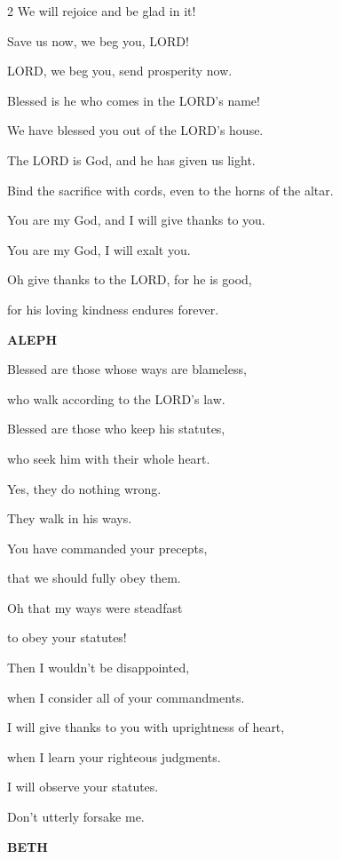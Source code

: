 \begin{multicols}{2}
	We will rejoice and be glad in it!
	
	
	\myverse{}Save us now, we beg you, LORD!
	
	LORD, we beg you, send prosperity now.
	
	
	\myverse{}Blessed is he who comes in the LORD’s name!
	
	We have blessed you out of the LORD’s house.
	
	
	\myverse{}The LORD is God, and he has given us light.
	
	Bind the sacrifice with cords, even to the horns of the altar.
	
	
	\myverse{}You are my God, and I will give thanks to you.
	
	You are my God, I will exalt you.
	
	
	\myverse{}Oh give thanks to the LORD, for he is good,
	
	for his loving kindness endures forever.
	
	
	\mychapter{}\textbf{ALEPH}
	
	\quad\quad\quad \myverse*{}Blessed are those whose ways are blameless,
	
	who walk according to the LORD’s law.
	
	
	\myverse{}Blessed are those who keep his statutes,
	
	who seek him with their whole heart.
	
	
	\myverse{}Yes, they do nothing wrong.
	
	They walk in his ways.
	
	
	\myverse{}You have commanded your precepts,
	
	that we should fully obey them.
	
	
	\myverse{}Oh that my ways were steadfast
	
	to obey your statutes!
	
	
	\myverse{}Then I wouldn’t be disappointed,
	
	when I consider all of your commandments.
	
	
	\myverse{}I will give thanks to you with uprightness of heart,
	
	when I learn your righteous judgments.
	
	
	\myverse{}I will observe your statutes.
	
	Don’t utterly forsake me.
	
	\vspace{\baselineskip}
	
	\textbf{BETH}
	

\end{multicols}

